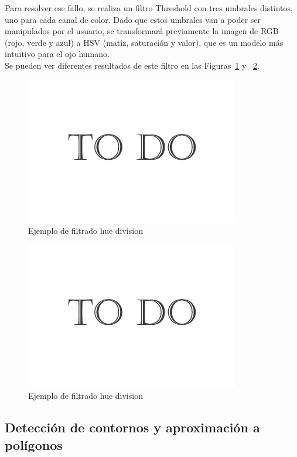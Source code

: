 {	Para resolver ese fallo, se realiza un filtro Threshold con tres umbrales distintos, uno para cada canal de color. Dado que estos umbrales van a poder ser manipulados por el usuario, se transformará previamente la imagen de RGB (rojo, verde y azul) a HSV (matiz, saturación y valor), que es un modelo más intuitivo para el ojo humano.\\
	
	Se pueden ver diferentes resultados de este filtro en las Figuras~\ref{fig:colorthres1} y ~\ref{fig:colorthres2}.
	
		\begin{figure}[htbp]
		\centering
		\hspace*{-0.3in}
		\includegraphics[scale=0.47]{graphics/todo.png}
		\caption{Ejemplo de filtrado hue division}
		\label{fig:colorthres1}
		\end{figure}
	
		\begin{figure}[htbp]
		\centering
		\hspace*{-0.3in}
		\includegraphics[scale=0.47]{graphics/todo.png}
		\caption{Ejemplo de filtrado hue division}
		\label{fig:colorthres2}
		\end{figure}
	
	
	
	\subsection{Detección de contornos y aproximación a polígonos}
	\label{sec:deteccionContornos}
	
}
